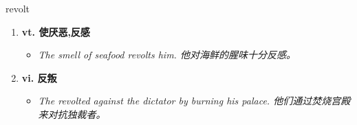 
\begin{frame}
{\huge revolt}
\begin{center}
\begin{enumerate}\Large
  \item \textbf{vt. 使厌恶,反感}
  \begin{itemize}
    \item \em{\Large{The smell of seafood revolts him. 他对海鲜的腥味十分反感。}}
  \end{itemize}
  \item \textbf{vi. 反叛}
  \begin{itemize}
    \item \em{\Large{The revolted against the dictator by burning his palace. 他们通过焚烧宫殿来对抗独裁者。}}
  \end{itemize}
\end{enumerate}
\end{center}
\end{frame}
